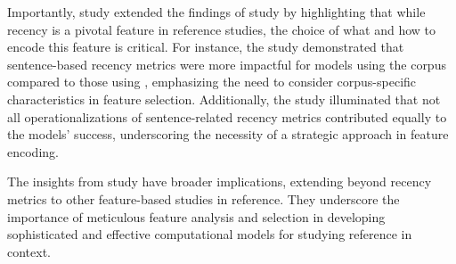 Importantly, study \studC extended the findings of study \studB by highlighting that while recency is a pivotal feature in reference studies, the choice of what and how to encode this feature is critical. For instance, the study demonstrated that sentence-based recency metrics were more impactful for models using the \wsj corpus compared to those using \msrcor, emphasizing the need to consider corpus-specific characteristics in feature selection. Additionally, the study illuminated that not all operationalizations of sentence-related recency metrics contributed equally to the models' success, underscoring the necessity of a strategic approach in feature encoding.

The insights from study \studC have broader implications, extending beyond recency metrics to other feature-based studies in reference. They underscore the importance of meticulous feature analysis and selection in developing sophisticated and effective computational models for studying reference in context.

